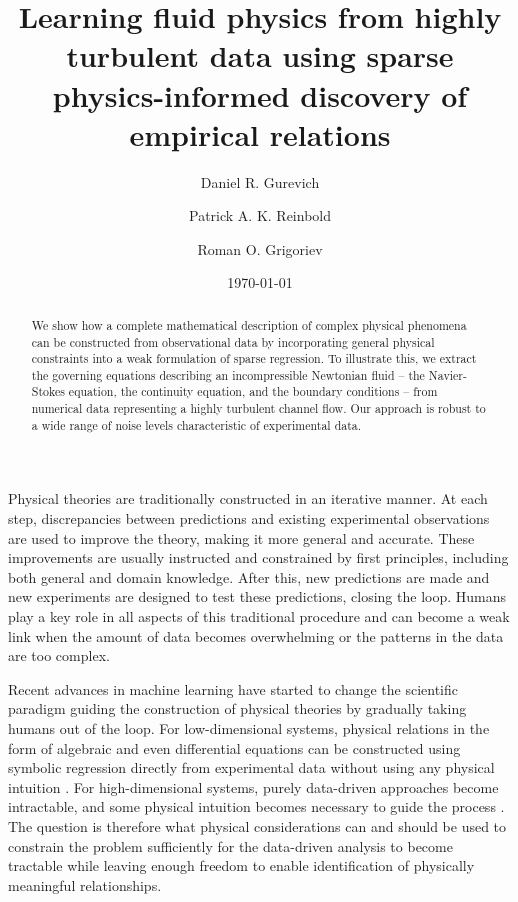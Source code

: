 \documentclass[
 reprint,
 amsmath,amssymb,
 aps,
]{revtex4-2}
\begin{document}
\title{Learning fluid physics from highly turbulent data using sparse physics-informed discovery of empirical relations}
\author{Daniel R. Gurevich}
\author{Patrick A. K. Reinbold}
\author{Roman O. Grigoriev}
\date{\today}

\begin{abstract}
We show how a complete mathematical description of complex physical phenomena can be constructed from observational data by incorporating general physical constraints into a weak formulation of sparse regression. To illustrate this, we extract the governing equations describing an incompressible Newtonian fluid -- the Navier-Stokes equation, the continuity equation, and the boundary conditions -- from numerical data representing a highly turbulent channel flow. Our approach is robust to a wide range of noise levels characteristic of experimental data.
\end{abstract}


\maketitle

Physical theories are traditionally constructed in an iterative manner. At each step, discrepancies between predictions and existing experimental observations are used to improve the theory, making it more general and accurate. These improvements are usually instructed and constrained by first principles, including both general and domain knowledge. After this, new predictions are made and new experiments are designed to test these predictions, closing the loop. Humans play a key role in all aspects of this traditional procedure and can become a weak link when the amount of data becomes overwhelming or the patterns in the data are too complex. 

Recent advances in machine learning have started to change the scientific paradigm guiding the construction of physical theories by gradually taking humans out of the loop. For low-dimensional systems, physical relations in the form of algebraic and even differential equations can be constructed using symbolic regression directly from experimental data without using any physical intuition \cite{crutchfield1987,bongard2007,schmidt2009}. For high-dimensional systems, purely data-driven approaches become intractable, and some physical intuition becomes necessary to guide the process \cite{karpatne2017}. The question is therefore what physical considerations can and should be used to constrain the problem sufficiently for the data-driven analysis to become tractable while leaving enough freedom to enable identification of physically meaningful relationships. 
\end{document}
